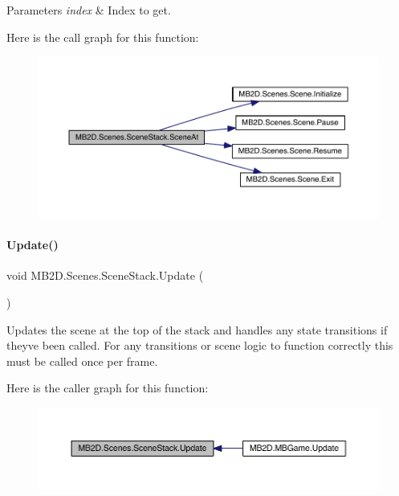 \begin{DoxyParams}{Parameters}
{\em index} & Index to get.\\
\hline
\end{DoxyParams}
Here is the call graph for this function\+:
\nopagebreak
\begin{figure}[H]
\begin{center}
\leavevmode
\includegraphics[width=350pt]{class_m_b2_d_1_1_scenes_1_1_scene_stack_a84b1a5b2771f6c663eece04bcafd5416_cgraph}
\end{center}
\end{figure}
\hypertarget{class_m_b2_d_1_1_scenes_1_1_scene_stack_a8486b29eb65458e88512989201772984}{}\label{class_m_b2_d_1_1_scenes_1_1_scene_stack_a8486b29eb65458e88512989201772984} 
\paragraph{\texorpdfstring{Update()}{Update()}}
{\footnotesize\ttfamily void M\+B2\+D.\+Scenes.\+Scene\+Stack.\+Update (\begin{DoxyParamCaption}{ }\end{DoxyParamCaption})\hspace{0.3cm}{\ttfamily [inline]}}



Updates the scene at the top of the stack and handles any state transitions if they\textquotesingle{}ve been called. For any transitions or scene logic to function correctly this must be called once per frame. 

Here is the caller graph for this function\+:
\nopagebreak
\begin{figure}[H]
\begin{center}
\leavevmode
\includegraphics[width=350pt]{class_m_b2_d_1_1_scenes_1_1_scene_stack_a8486b29eb65458e88512989201772984_icgraph}
\end{center}
\end{figure}


